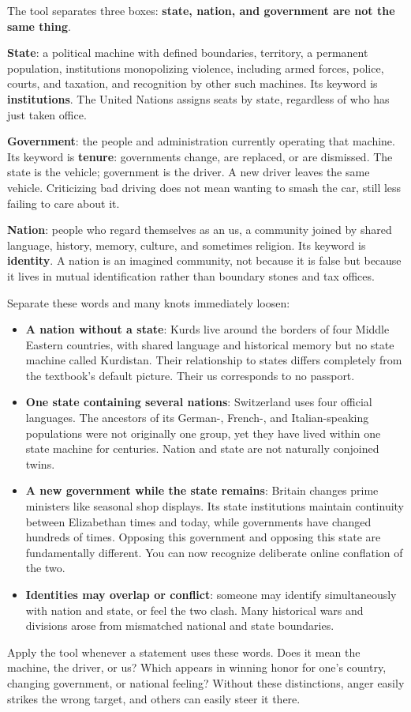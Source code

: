 The tool separates three boxes: \textbf{state, nation, and government are not the same thing}.

\textbf{State}: a political machine with defined boundaries, territory, a permanent population, institutions monopolizing violence, including armed forces, police, courts, and taxation, and recognition by other such machines. Its keyword is \textbf{institutions}. The United Nations assigns seats by state, regardless of who has just taken office.

\textbf{Government}: the people and administration currently operating that machine. Its keyword is \textbf{tenure}: governments change, are replaced, or are dismissed. The state is the vehicle; government is the driver. A new driver leaves the same vehicle. Criticizing bad driving does not mean wanting to smash the car, still less failing to care about it.

\textbf{Nation}: people who regard themselves as an us, a community joined by shared language, history, memory, culture, and sometimes religion. Its keyword is \textbf{identity}. A nation is an imagined community, not because it is false but because it lives in mutual identification rather than boundary stones and tax offices.

Separate these words and many knots immediately loosen:

\begin{itemize}
\item \textbf{A nation without a state}: Kurds live around the borders of four Middle Eastern countries, with shared language and historical memory but no state machine called Kurdistan. Their relationship to states differs completely from the textbook's default picture. Their us corresponds to no passport.
\item \textbf{One state containing several nations}: Switzerland uses four official languages. The ancestors of its German-, French-, and Italian-speaking populations were not originally one group, yet they have lived within one state machine for centuries. Nation and state are not naturally conjoined twins.
\item \textbf{A new government while the state remains}: Britain changes prime ministers like seasonal shop displays. Its state institutions maintain continuity between Elizabethan times and today, while governments have changed hundreds of times. Opposing this government and opposing this state are fundamentally different. You can now recognize deliberate online conflation of the two.
\item \textbf{Identities may overlap or conflict}: someone may identify simultaneously with nation and state, or feel the two clash. Many historical wars and divisions arose from mismatched national and state boundaries.
\end{itemize}
Apply the tool whenever a statement uses these words. Does it mean the machine, the driver, or us? Which appears in winning honor for one's country, changing government, or national feeling? Without these distinctions, anger easily strikes the wrong target, and others can easily steer it there.

